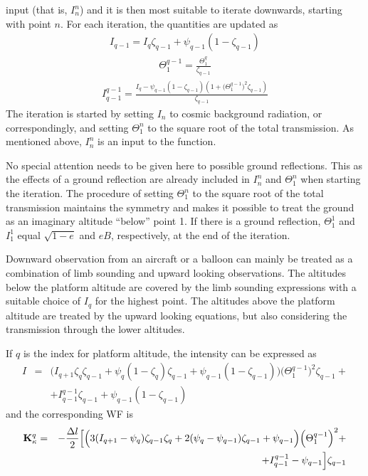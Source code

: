  input (that is, $I_n^n$) and it is then most suitable to iterate
 downwards, starting with point $n$. For each iteration, the
 quantities are updated as
 \begin{eqnarray}
   I_{q-1} = I_q\zeta_{q-1} + \psi_{q-1}(1-\zeta_{q-1}) \nonumber
 \end{eqnarray}
 \begin{eqnarray}
   \Theta_{1}^{q-1} =  \frac{\Theta_{1}^{q}}{\zeta_{q-1}} \nonumber
 \end{eqnarray}
 \begin{eqnarray}
   I_{q-1}^{q-1} = \frac{I_q - \psi_{q-1}(1-\zeta_{q-1})
       (1+\big(\Theta^{q-1}_{1}\big)^2\zeta_{q-1})}{\zeta_{q-1}} \nonumber
 \end{eqnarray}
 The iteration is started by setting $I_n$ to cosmic
 background radiation, or correspondingly, and setting
 $\Theta^n_1$ to the square root of the total transmission. As
 mentioned above, $I_n^n$ is an input to the function.
 
 No special attention needs to be given here to possible ground
 reflections.  This as the effects of a ground reflection are already
 included in $I_n^n$ and $\Theta^n_1$ when starting the iteration. The
 procedure of setting $\Theta^n_1$ to the square root of the total
 transmission maintains the symmetry and makes it possible to treat
 the ground as an imaginary altitude ``below'' point 1. If there is a
 ground reflection, $\Theta^1_1$ and $I_1^1$ equal $\sqrt{1-e}$ and
 $eB$, respectively, at the end of the iteration.


 

  \label{sec:wfuns:down}
  Downward observation from an aircraft or a balloon can mainly be
  treated as a combination of limb sounding and upward looking
  observations.  The altitudes below the platform altitude are covered
  by the limb sounding expressions with a suitable choice of $I_q$ for
  the highest point. The altitudes above the platform altitude are
  treated by the upward looking equations, but also considering the
  transmission through the lower altitudes. 
  
  If $q$ is the index for platform altitude, the intensity can be
  expressed as
  \begin{eqnarray}
   I &=& \Big(I_{q+1}\zeta_q\zeta_{q-1} +\psi_q(1-\zeta_q)\zeta_{q-1} + 
           \psi_{q-1}(1-\zeta_{q-1})\Big)\Big(\Theta^{q-1}_{1}\Big)^2
           \zeta_{q-1} + \nonumber \\
      & & + I_{q-1}^{q-1}\zeta_{q-1} + \psi_{q-1}(1-\zeta_{q-1})
    \label{eq:wfuns:idown}
  \end{eqnarray}
  and the corresponding WF is
  \begin{eqnarray}
   \mathbf{K}_{\kappa}^q& = & -\frac{\Delta l}{2}\Big[\Big(3(I_{q+1}-\psi_q)
           \zeta_{q-1}\zeta_q+ 2(\psi_q-\psi_{q-1})\zeta_{q-1} + \psi_{q-1} \Big)
           \Big(\Theta^{q-1}_{1}\Big)^2 + \nonumber \\
      & &  + I_{q-1}^{q-1}-\psi_{q-1}\Big]\zeta_{q-1}
  \end{eqnarray}



